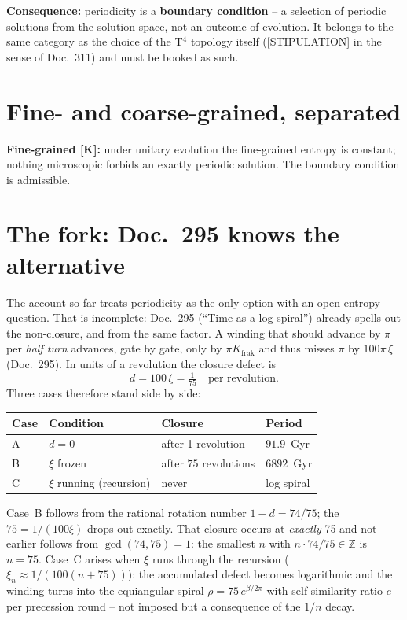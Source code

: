 \documentclass[11pt]{report}
\begin{document}
\textbf{Consequence:} periodicity is a \textbf{boundary
condition} -- a selection of periodic solutions from the solution
space, not an outcome of evolution. It belongs to the same
category as the choice of the T$^4$ topology itself ([STIPULATION]
in the sense of Doc.~311) and must be booked as such.

\section{Fine- and coarse-grained, separated}

\textbf{Fine-grained [K]:} under unitary evolution the
fine-grained entropy is constant; nothing microscopic forbids an
exactly periodic solution. The boundary condition is admissible.

\section{The fork: Doc.~295 knows the alternative}

The account so far treats periodicity as the only option with an
open entropy question. That is incomplete: Doc.~295
(\enquote{Time as a log spiral}) already spells out the
non-closure, and from the same factor. A winding that should
advance by $\pi$ per \emph{half turn} advances, gate by gate, only
by $\pi K_\text{frak}$ and thus misses $\pi$ by $100\pi\,\xi$
(Doc.~295). In units of a revolution the closure defect is
\begin{equation}
  d = 100\,\xi = \tfrac{1}{75}\quad\text{per revolution.}
\end{equation}
Three cases therefore stand side by side:

\begin{center}
\begin{tabular}{llll}
\toprule
Case & Condition & Closure & Period \\
\midrule
A & $d = 0$ & after 1 revolution & $91.9$~Gyr \\
B & $\xi$ frozen & after $75$ revolutions & $6892$~Gyr \\
C & $\xi$ running (recursion) & never & log spiral \\
\bottomrule
\end{tabular}
\end{center}

\noindent Case~B follows from the rational rotation number
$1-d = 74/75$; the $75 = 1/(100\xi)$ drops out exactly. That closure occurs at \emph{exactly}
75 and not earlier follows from $\gcd(74,75) = 1$: the smallest
$n$ with $n\cdot 74/75 \in \mathbb{Z}$ is $n = 75$. Case~C
arises when $\xi$ runs through the recursion
($\xi_n \approx 1/(100(n{+}75))$): the accumulated defect becomes
logarithmic and the winding turns into the equiangular spiral
$\rho = 75\,e^{\beta/2\pi}$ with self-similarity ratio $e$ per
precession round -- not imposed but a consequence of the $1/n$
decay.
\end{document}
